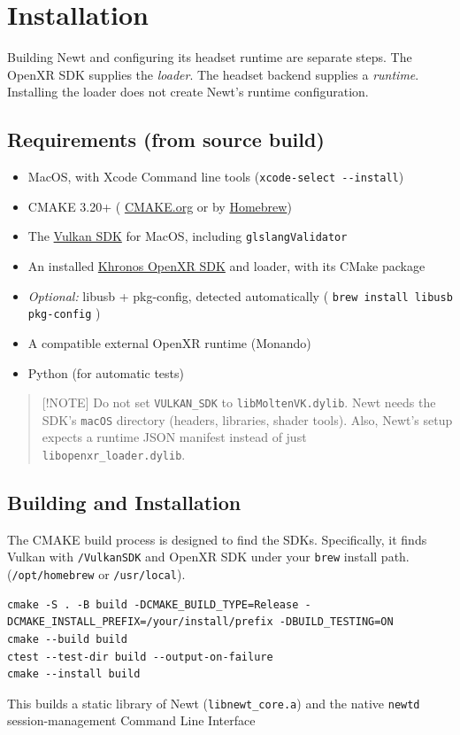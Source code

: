 \documentclass[11pt]{article}
\begin{document}
\section{Installation}
\label{sec:orgb948b55}
Building Newt and configuring its headset runtime are separate steps. The OpenXR SDK supplies the \emph{loader}. The headset backend supplies a \emph{runtime}. Installing the loader does not create Newt's runtime configuration.
\subsection{Requirements (from source build)}
\label{sec:org7925b9e}
\begin{itemize}
\item MacOS, with Xcode Command line tools (\texttt{xcode-select -{}-{}install})
\item CMAKE 3.20+ ( \href{https://cmake.org/}{CMAKE.org} or by \href{https://formulae.brew.sh/formula/cmake}{Homebrew})
\item The \href{https://vulkan.lunarg.com/sdk/home}{Vulkan SDK} for MacOS, including \texttt{glslangValidator}
\item An installed \href{https://github.com/KhronosGroup/OpenXR-SDK}{Khronos OpenXR SDK} and loader, with its CMake package
\item \emph{Optional:} libusb + pkg-config, detected automatically ( \texttt{brew install libusb pkg-config} )
\item A compatible external OpenXR runtime (Monando)
\item Python (for automatic tests)
\end{itemize}
\begin{quote}
{[}!NOTE]
Do not set \texttt{VULKAN\_SDK} to \texttt{libMoltenVK.dylib}. Newt needs the SDK's \texttt{macOS} directory (headers, libraries, shader tools). Also, Newt's setup expects a runtime JSON manifest instead of just \texttt{libopenxr\_loader.dylib}.
\end{quote}
\subsection{Building and Installation}
\label{sec:org9639605}
The CMAKE build process is designed to find the SDKs. Specifically, it finds Vulkan with \texttt{/VulkanSDK} and OpenXR SDK under your \texttt{brew} install path. (\texttt{/opt/homebrew} or \texttt{/usr/local}).
\begin{verbatim}
cmake -S . -B build -DCMAKE_BUILD_TYPE=Release -DCMAKE_INSTALL_PREFIX=/your/install/prefix -DBUILD_TESTING=ON
cmake --build build
ctest --test-dir build --output-on-failure
cmake --install build
\end{verbatim}
This builds a static library of Newt (\texttt{libnewt\_core.a}) and the native \texttt{newtd} session-management Command Line Interface
\end{document}
